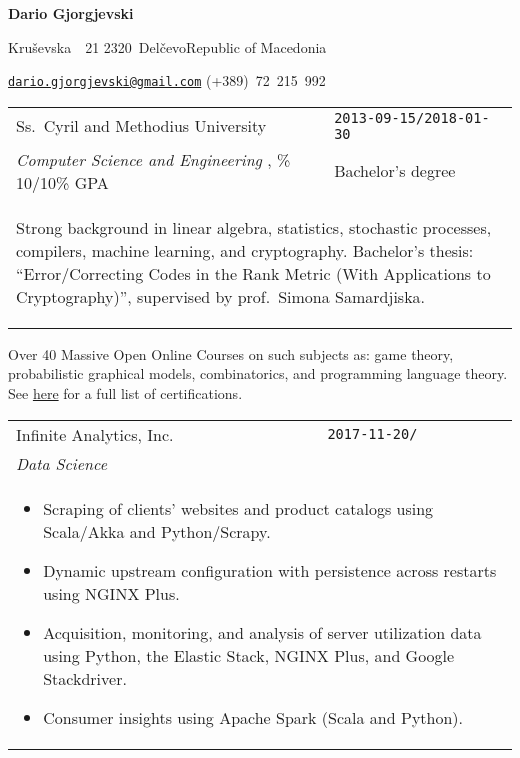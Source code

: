 \documentclass[version=last, paper=A4, DIV=12, toc=bibliography]{scrartcl}%
\newcommand*{\EducationEntry}[6]{%
  \noindent%
  \begin{tabular}{p{.7\textwidth-2\tabcolsep}>{\raggedleft\arraybackslash}p{.3\textwidth-2\tabcolsep}}
    \textsf{#2} & \Verb+#1+\\
    \textit{#4}, \num[round-mode=places, round-precision=2, round-integer-to-decimal]{#5} GPA & #3\\
    \multicolumn{2}{p{\textwidth-2\tabcolsep}}{\begin{addmargin}{2em}\small#6\end{addmargin}}
  \end{tabular}%
}
\newcommand*{\WorkEntry}[4]{%
  \noindent%
  \begin{tabular}{p{.7\textwidth-2\tabcolsep}>{\raggedleft\arraybackslash}p{.3\textwidth-2\tabcolsep}}
    \textsf{#2} & \Verb+#1+\\
    \textit{#3} &\\
    \multicolumn{2}{p{\textwidth-2\tabcolsep}}{\begin{addmargin}{2em}\small#4\end{addmargin}}
  \end{tabular}%
}
\begin{document}
\begin{addmargin}{.125\textwidth}
  \begin{center}
    \bfseries\LARGE Dario Gjorgjevski
  \end{center}
  \begin{FlushLeft}
    \begin{description}[itemsep=.1em, leftmargin=*]
    \item[\faHome] Kruševska~\textnumero~21\hfill\textbullet\hfill
      2320~Delčevo\hfill\textbullet\hfill Republic of Macedonia
    \item[\faAddressCard] \href{mailto:dario.gjorgjevski@gmail.com}%
      {\nolinkurl{dario.gjorgjevski@gmail.com}}\hfill
      (+389)~72~215~992
    \end{description}
  \end{FlushLeft}
\end{addmargin}


\EducationEntry{2013-09-15/2018-01-30}{%
  Ss.\ Cyril and Methodius University%
}{%
  Bachelor's degree%
}{%
  Computer Science and Engineering%
}{%
  10/10%
}{%
  Strong background in linear algebra, statistics, stochastic
  processes, compilers, machine learning, and cryptography.
  Bachelor's thesis: \enquote{Error\-/Correcting Codes in the Rank
    Metric (With Applications to Cryptography)}, supervised by prof.\
  Simona Samardjiska.%
}

{\noindent\small Over \num{40} Massive Open Online Courses on such
  subjects as: game theory, probabilistic graphical models,
  combinatorics, and programming language theory.  See
  \href{https://github.com/d125q/Personal/tree/master/Certifications}{here}
  for a full list of certifications.\par}


\WorkEntry{2017-11-20/}{%
  Infinite Analytics, Inc.%
}{%
  Data Science%
}{%
  \begin{itemize}[noitemsep, leftmargin=*]
  \item Scraping of clients' websites and product catalogs using
    Scala/Akka and Python/Scrapy.
  \item Dynamic upstream configuration with persistence across
    restarts using NGINX Plus.
  \item Acquisition, monitoring, and analysis of server utilization
    data using Python, the Elastic Stack, NGINX Plus, and Google
    Stackdriver.
  \item Consumer insights using Apache Spark (Scala and Python).%
  \end{itemize}%
}
\end{document}
